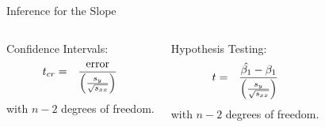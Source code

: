 \begin{frame}{Inference for the Slope}

  \begin{columns}

    Confidence Intervals:
    \begin{eqnarray*}
      t_{cr} & = & \frac{\mathrm{error}}{\left(\frac{s_y}{\sqrt{s_{xx}}}\right)}
    \end{eqnarray*}
    with $n-2$ degrees of freedom.


    Hypothesis Testing:
    \begin{eqnarray*}
      t & = & \frac{\hat{\beta_1}-\beta_1}{\left( \frac{s_y}{\sqrt{s_{xx}}}\right)}
    \end{eqnarray*}
    with $n-2$ degrees of freedom.

    
  \end{columns}

\end{frame}

